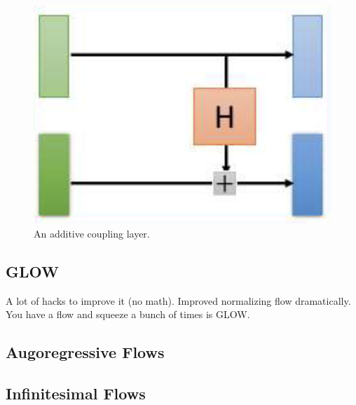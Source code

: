     \begin{figure}[H]
      \centering 
      \includegraphics[scale=0.3]{img/nice_coupling.png}
      \caption{An additive coupling layer. } 
      \label{fig:nice_coupling}
    \end{figure}

\subsection{GLOW}

  A lot of hacks to improve it (no math). Improved normalizing flow dramatically. 
  You have a flow and squeeze a bunch of times is GLOW. 

\subsection{Augoregressive Flows} 

\subsection{Infinitesimal Flows} 



